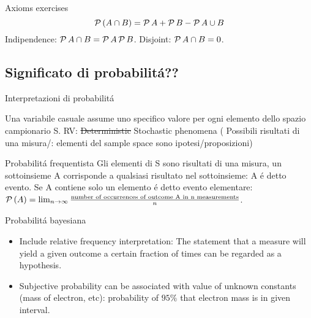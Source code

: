 \begin{wordonframe}{Axioms exercises}
\[\operatorname{\mathcal{P}}{(A\cap B)}=\operatorname{\mathcal{P}}{A}+\operatorname{\mathcal{P}}{B}-\operatorname{\mathcal{P}}{A\cup B}\]
Indipendence: $\operatorname{\mathcal{P}}{A\cap B}=\operatorname{\mathcal{P}}{A}\operatorname{\mathcal{P}}{B}$.
Disjoint: $\operatorname{\mathcal{P}}{A\cap B}=0$.
\end{wordonframe}

\subsection{Significato di probabilit\'a??}

\begin{frame}{Interpretazioni di probabilit\'a}
\begin{block}{Una variabile casuale assume uno specifico valore per ogni elemento dello spazio campionario S.}
RV: \sout{Deterministic} Stochastic phenomena ( Possibili risultati di una misura/: elementi del sample space sono ipotesi/proposizioni)
\end{block}
\begin{block}{Probabilit\'a frequentista}
Gli elementi di S sono risultati di una misura, un sottoinsieme A corrisponde a qualsiasi risultato nel sottoinsieme: A \'e detto evento. Se A contiene solo un elemento \'e detto evento elementare: $\operatorname{\mathcal{P}}{(A)}=\lim_{n\to\infty}\frac{\text{number of occurrences of outcome A in n measurements}}{n}$.
\end{block}
\begin{block}{Probabilit\'a bayesiana}

\begin{itemize}
\item Include relative frequency interpretation: The statement that a measure will yield a given outcome a certain fraction of times can be regarded as a hypothesis.
\item Subjective probability can be associated with value of unknown constants (mass of electron, etc): probability of $95\%$ that electron mass is in given interval.
\end{itemize}
\end{block}
\end{frame}

